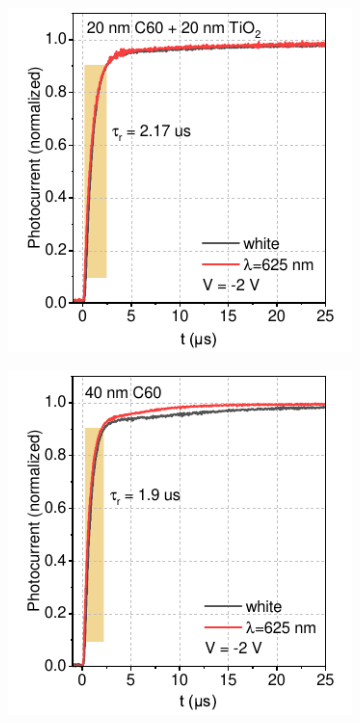 \begin{figure}[t]
\begin{subfigure}[t]{0.45\textwidth}
        \caption{}
        \label{}
    \end{subfigure} 
    \begin{subfigure}[t]{0.45\textwidth}
        \centering
        \includegraphics[width=\textwidth]{chapters/transport_layers/images/Rise_time_20_20.pdf} %
        \caption{}
        \label{}
    \end{subfigure}
    \hfill
    \begin{subfigure}[t]{0.45\textwidth}
        \centering
        \includegraphics[width=\textwidth]{chapters/transport_layers/images/Rise_time_40C60.pdf} %

\end{subfigure}
\end{figure}
